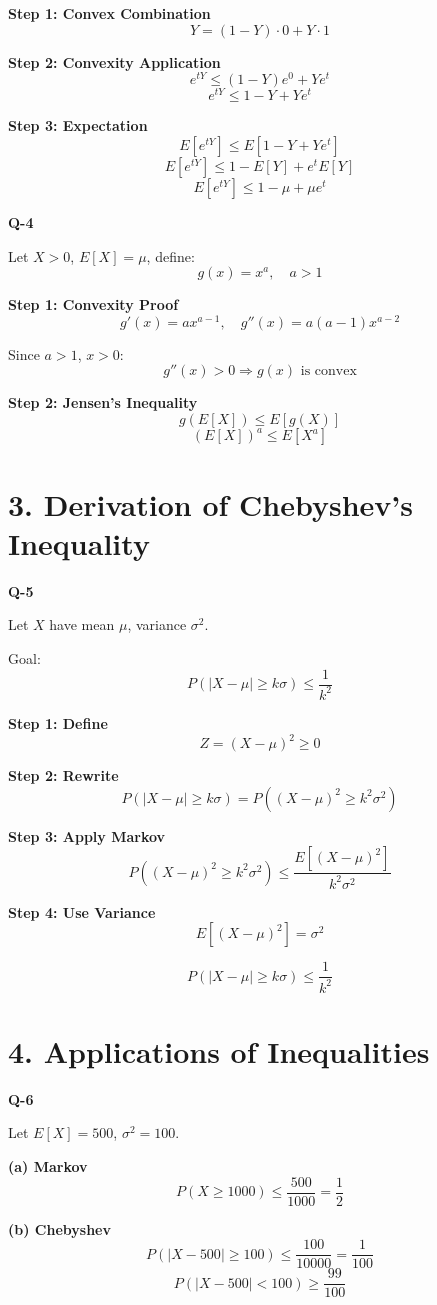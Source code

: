 \documentclass[12pt]{article}
\begin{document}
\textbf{Step 1: Convex Combination}
\[
Y = (1 - Y)\cdot 0 + Y \cdot 1
\]

\textbf{Step 2: Convexity Application}
\[
e^{tY} \le (1 - Y)e^0 + Y e^t
\]
\[
e^{tY} \le 1 - Y + Y e^t
\]

\textbf{Step 3: Expectation}
\[
E[e^{tY}] \le E[1 - Y + Y e^t]
\]
\[
E[e^{tY}] \le 1 - E[Y] + e^t E[Y]
\]
\[
E[e^{tY}] \le 1 - \mu + \mu e^t
\]

\textbf{Q-4}

Let $X > 0$, $E[X] = \mu$, define:
\[
g(x) = x^a, \quad a > 1
\]

\textbf{Step 1: Convexity Proof}
\[
g'(x) = ax^{a-1}, \quad g''(x) = a(a-1)x^{a-2}
\]

Since $a > 1$, $x > 0$:
\[
g''(x) > 0 \Rightarrow g(x) \text{ is convex}
\]

\textbf{Step 2: Jensen’s Inequality}
\[
g(E[X]) \le E[g(X)]
\]
\[
(E[X])^a \le E[X^a]
\]

\section*{3. Derivation of Chebyshev’s Inequality}

\textbf{Q-5}

Let $X$ have mean $\mu$, variance $\sigma^2$.

Goal:
\[
P(|X - \mu| \ge k\sigma) \le \frac{1}{k^2}
\]

\textbf{Step 1: Define}
\[
Z = (X - \mu)^2 \ge 0
\]

\textbf{Step 2: Rewrite}
\[
P(|X - \mu| \ge k\sigma) = P((X - \mu)^2 \ge k^2\sigma^2)
\]

\textbf{Step 3: Apply Markov}
\[
P((X - \mu)^2 \ge k^2\sigma^2) \le \frac{E[(X - \mu)^2]}{k^2\sigma^2}
\]

\textbf{Step 4: Use Variance}
\[
E[(X - \mu)^2] = \sigma^2
\]

\[
P(|X - \mu| \ge k\sigma) \le \frac{1}{k^2}
\]

\section*{4. Applications of Inequalities}

\textbf{Q-6}

Let $E[X] = 500$, $\sigma^2 = 100$.

\textbf{(a) Markov}
\[
P(X \ge 1000) \le \frac{500}{1000} = \frac{1}{2}
\]

\textbf{(b) Chebyshev}
\[
P(|X - 500| \ge 100) \le \frac{100}{10000} = \frac{1}{100}
\]
\[
P(|X - 500| < 100) \ge \frac{99}{100}
\]
\end{document}
